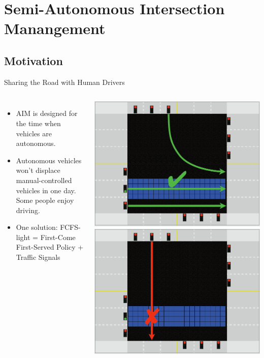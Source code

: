\documentclass{beamer}
\begin{document}
\section{Semi-Autonomous Intersection Manangement}

\subsection{Motivation}

\begin{frame}{Sharing the Road with Human Drivers}
\begin{columns}[c]
\begin{itemize}
\item AIM is designed for the time when vehicles are autonomous.
\item Autonomous vehicles won't displace manual-controlled vehicles in one
day. Some people enjoy driving.\pause
\item One solution: FCFS-light = First-Come First-Served Policy + Traffic Signals
\end{itemize}
\includegraphics[width=\textwidth]{fcfs-light-1.png}
\hfill
\includegraphics[width=\textwidth]{fcfs-light-2.png}
\end{columns}
\end{frame}
\end{document}
